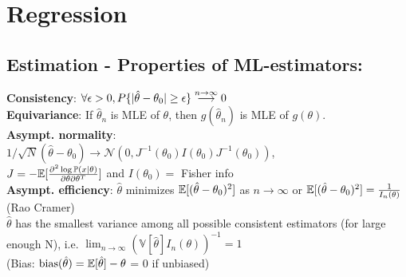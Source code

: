 \section{Regression}
\subsection*{Estimation - Properties of ML-estimators:}
\textbf{Consistency}: $\forall\epsilon>0, P \{|\hat{\theta}-\theta_0| \geq\epsilon\} \stackrel{\tiny n \to\infty}{\longrightarrow} 0 $\\
\textbf{Equivariance}: If $\hat \theta_n$ is MLE of $\theta$, then $g(\hat \theta_n)$ is MLE of $g(\theta)$.\\
\textbf{Asympt. normality}:\\
$1/\sqrt{N}(\hat{\theta} - \theta_0) \to \mathcal{N}(0, J^{-1}(\theta_0)I(\theta_0)J^{-1}(\theta_0))$,\\ 
$J= -\mathbb E[\frac{\partial^2 \log \mathbb{P}(x|\theta) }{\partial \theta \partial \theta ^{T}}]$ and $I(\theta_0)=$ Fisher info \\
\textbf{Asympt. efficiency}: $\hat{\theta}$ minimizes $\mathbb E[(\hat{\theta}-\theta_0)^2]$ as $n \to\infty$ or $\mathbb E[(\hat{\theta}-\theta_0)^2] = \frac{1}{I_n(\theta)}$ (Rao Cramer)\\
$\hat{\theta}$ has the smallest variance among all possible consistent estimators (for large enough N), i.e. $\lim_{n\to\infty} (\mathbb{V}[\hat{\theta}]I_n(\theta))^{-1} = 1$\\
(Bias: $\text{bias}(\hat{\theta}) = \mathbb E[\hat{\theta}]-\theta$ = 0 if unbiased)
	
